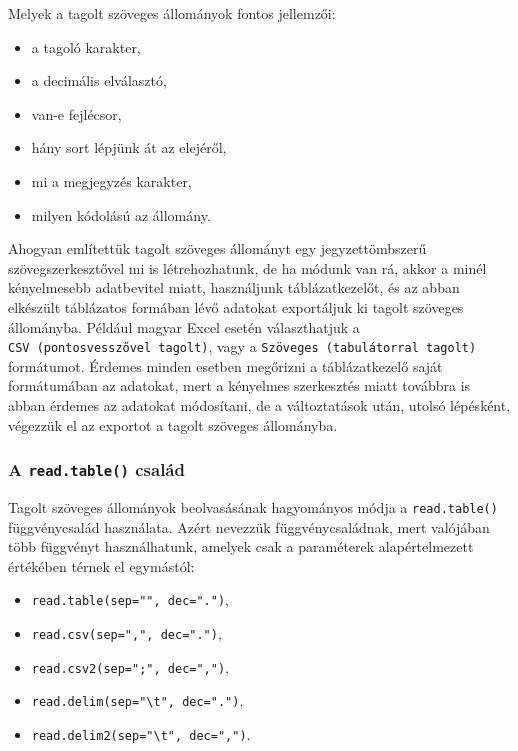 \documentclass[
]{book}
\providecommand{\tightlist}{%
  \setlength{\itemsep}{0pt}\setlength{\parskip}{0pt}}
\begin{document}
Melyek a tagolt szöveges állományok fontos jellemzői:

\begin{itemize}
\tightlist
\item
  a tagoló karakter,
\item
  a decimális elválasztó,
\item
  van-e fejlécsor,
\item
  hány sort lépjünk át az elejéről,
\item
  mi a megjegyzés karakter,
\item
  milyen kódolású az állomány.
\end{itemize}

Ahogyan említettük tagolt szöveges állományt egy jegyzettömbszerű szövegszerkesztővel mi is létrehozhatunk, de ha módunk van rá, akkor a minél kényelmesebb adatbevitel miatt, használjunk táblázatkezelőt, és az abban elkészült táblázatos formában lévő adatokat exportáljuk ki tagolt szöveges állományba. Például magyar Excel esetén választhatjuk a \texttt{CSV\ (pontosvesszővel\ tagolt)}, vagy a \texttt{Szöveges\ (tabulátorral\ tagolt)} formátumot. Érdemes minden esetben megőrizni a táblázatkezelő saját formátumában az adatokat, mert a kényelmes szerkesztés miatt továbbra is abban érdemes az adatokat módosítani, de a változtatások után, utolsó lépésként, végezzük el az exportot a tagolt szöveges állományba.

\hypertarget{a-read.table-csaluxe1d}{%
\subsubsection{\texorpdfstring{A \texttt{read.table()} család}{A read.table() család}}\label{a-read.table-csaluxe1d}}

Tagolt szöveges állományok beolvasásának hagyományos módja a \texttt{read.table()} függvénycsalád használata. Azért nevezzük függvénycsaládnak, mert valójában több függvényt használhatunk, amelyek csak a paraméterek alapértelmezett értékében térnek el egymástól:

\begin{itemize}
\tightlist
\item
  \texttt{read.table(sep="",\ dec=".")},
\item
  \texttt{read.csv(sep=",",\ dec=".")},
\item
  \texttt{read.csv2(sep=";",\ dec=",")},
\item
  \texttt{read.delim(sep="\textbackslash{}t",\ dec=".")},
\item
  \texttt{read.delim2(sep="\textbackslash{}t",\ dec=",")}.
\end{itemize}
\end{document}
